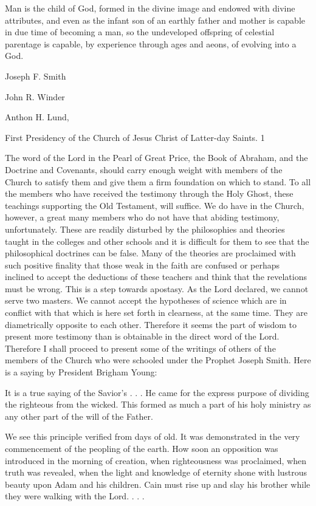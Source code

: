Man is the child of God, formed in the divine image and endowed with divine attributes, and
even as the infant son of an earthly father and mother is capable in due time of becoming a
man, so the undeveloped offspring of celestial parentage is capable, by experience through
ages and aeons, of evolving into a God.

Joseph F. Smith

John R. Winder

Anthon H. Lund,

First Presidency of the Church of Jesus Christ of Latter-day Saints. 1

The word of the Lord in the Pearl of Great Price, the Book of Abraham, and the Doctrine and
Covenants, should carry enough weight with members of the Church to satisfy them and give
them a firm foundation on which to stand. To all the members who have received the
testimony through the Holy Ghost, these teachings supporting the Old Testament, will
suffice. We do have in the Church, however, a great many members who do not have that
abiding testimony, unfortunately. These are readily disturbed by the philosophies and
theories taught in the colleges and other schools and it is difficult for them to see that the
philosophical doctrines can be false. Many of the theories are proclaimed with such positive
finality that those weak in the faith are confused or perhaps inclined to accept the deductions
of these teachers and think that the revelations must be wrong. This is a step towards
apostasy. As the Lord declared, we cannot serve two masters. We cannot accept the
hypotheses of science which are in conflict with that which is here set forth in clearness, at
the same time. They are diametrically opposite to each other. Therefore it seems the part of
wisdom to present more testimony than is obtainable in the direct word of the Lord.
Therefore I shall proceed to present some of the writings of others of the members of the
Church who were schooled under the Prophet Joseph Smith. Here is a saying by President
Brigham Young:

It is a true saying of the Savior's . . . He came for the express purpose of dividing the
righteous from the wicked. This formed as much a part of his holy ministry as any other part
of the will of the Father.

We see this principle verified from days of old. It was demonstrated in the very
commencement of the peopling of the earth. How soon an opposition was introduced in the
morning of creation, when righteousness was proclaimed, when truth was revealed, when the
light and knowledge of eternity shone with lustrous beauty upon Adam and his children. Cain
must rise up and slay his brother while they were walking with the Lord. . . .

